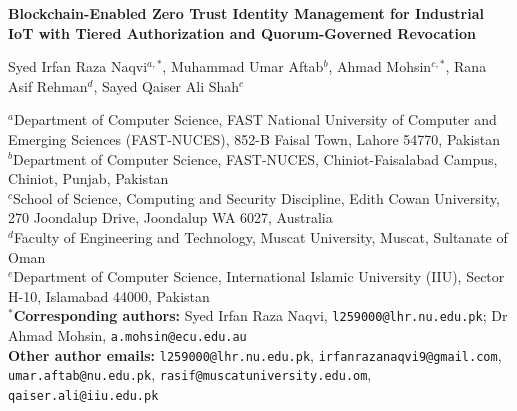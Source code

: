 \documentclass[10pt,a4paper]{extarticle}
\newcommand{\paperTitle}{Blockchain-Enabled Zero Trust Identity Management for Industrial IoT with Tiered Authorization and Quorum-Governed Revocation}
\begin{document}
\pagestyle{plain}
\begin{center}
{\Large\bfseries \paperTitle\par}
\vspace{1.2cm}
{\large Syed Irfan Raza Naqvi$^{a,*}$, Muhammad Umar Aftab$^{b}$, Ahmad Mohsin$^{c,*}$, Rana Asif Rehman$^{d}$, Sayed Qaiser Ali Shah$^{e}$\par}
\vspace{0.8cm}
\begin{flushleft}\small{}
$^{a}$Department of Computer Science, FAST National University of Computer and Emerging Sciences (FAST-NUCES), 852-B Faisal Town, Lahore 54770, Pakistan\\
$^{b}$Department of Computer Science, FAST-NUCES, Chiniot-Faisalabad Campus, Chiniot, Punjab, Pakistan\\
$^{c}$School of Science, Computing and Security Discipline, Edith Cowan University, 270 Joondalup Drive, Joondalup WA 6027, Australia\\
$^{d}$Faculty of Engineering and Technology, Muscat University, Muscat, Sultanate of Oman\\
$^{e}$Department of Computer Science, International Islamic University (IIU), Sector H-10, Islamabad 44000, Pakistan\\[1.2em]
$^{*}$\textbf{Corresponding authors:} Syed Irfan Raza Naqvi, \texttt{l259000@lhr.nu.edu.pk}; Dr Ahmad Mohsin, \texttt{a.mohsin@ecu.edu.au}\\[0.8em]
\textbf{Other author emails:} \texttt{l259000@lhr.nu.edu.pk}, \texttt{irfanrazanaqvi9@gmail.com}, \texttt{umar.aftab@nu.edu.pk}, \texttt{rasif@muscatuniversity.edu.om}, \texttt{qaiser.ali@iiu.edu.pk}
\end{flushleft}
\end{center}
\linenumbers
\end{document}
